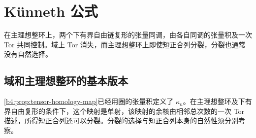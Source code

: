 
\section{Künneth 公式}
\label{b4:sec:0904}

在主理想整环上，两个下有界自由链复形的张量同调，由各自同调的张量积及一次 Tor 共同控制。域上 Tor 消失，而主理想整环上即使短正合列分裂，分裂也通常没有自然选择。

%
%
%

\subsection{域和主理想整环的基本版本}
\label{b4:subsec:0904:01}

\cref{b4:prop:tensor-homology-map}已经用圈的张量积定义了 \(\kappa_n\)。在主理想整环及下有界自由复形的条件下，这个映射是单射，该映射的余核由相邻总次数的一次 Tor 描述，所得短正合列还可以分裂。分裂的选择与短正合列本身的自然性须分别考察。

